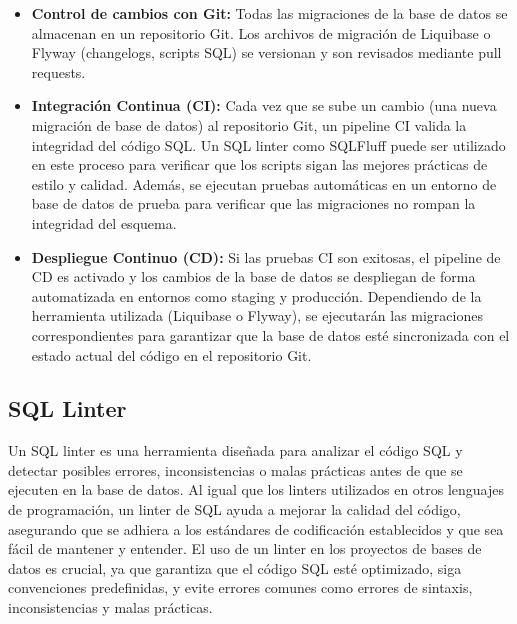 \documentclass{IEEEtran}
\begin{document}
\begin{itemize}
    \item \textbf{Control de cambios con Git:} Todas las migraciones de la base de datos se almacenan en un repositorio Git. Los archivos de migración de Liquibase o Flyway (changelogs, scripts SQL) se versionan y son revisados mediante pull requests.
    \item \textbf{Integración Continua (CI):} Cada vez que se sube un cambio (una nueva migración de base de datos) al repositorio Git, un pipeline CI valida la integridad del código SQL. Un SQL linter como SQLFluff puede ser utilizado en este proceso para verificar que los scripts sigan las mejores prácticas de estilo y calidad. Además, se ejecutan pruebas automáticas en un entorno de base de datos de prueba para verificar que las migraciones no rompan la integridad del esquema.
    \item \textbf{Despliegue Continuo (CD):} Si las pruebas CI son exitosas, el pipeline de CD es activado y los cambios de la base de datos se despliegan de forma automatizada en entornos como staging y producción. Dependiendo de la herramienta utilizada (Liquibase o Flyway), se ejecutarán las migraciones correspondientes para garantizar que la base de datos esté sincronizada con el estado actual del código en el repositorio Git.
\end{itemize}

\subsection{SQL Linter}
Un SQL linter es una herramienta diseñada para analizar el código SQL y detectar posibles errores, inconsistencias o malas prácticas antes de que se ejecuten en la base de datos. Al igual que los linters utilizados en otros lenguajes de programación, un linter de SQL ayuda a mejorar la calidad del código, asegurando que se adhiera a los estándares de codificación establecidos y que sea fácil de mantener y entender. El uso de un linter en los proyectos de bases de datos es crucial, ya que garantiza que el código SQL esté optimizado, siga convenciones predefinidas, y evite errores comunes como errores de sintaxis, inconsistencias y malas prácticas.
\end{document}
